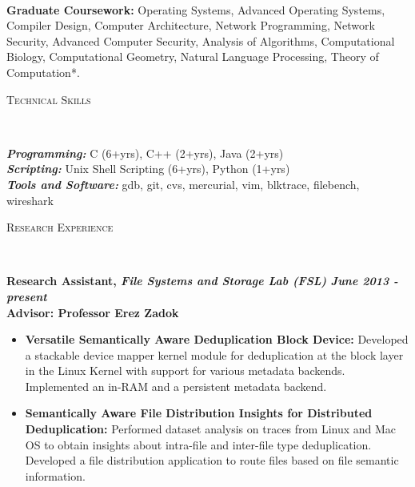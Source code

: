 \documentclass[11pt]{article}
\newenvironment{changemargin}[2]{%
  \begin{list}{}{%
    \setlength{\topsep}{0pt}%
    \setlength{\leftmargin}{#1}%
    \setlength{\rightmargin}{#2}%
    \setlength{\listparindent}{\parindent}%
    \setlength{\itemindent}{\parindent}%
    \setlength{\parsep}{\parskip}%
  }%
  \item[]}{\end{list}
}
\newcommand{\lineover}{
	\begin{changemargin}{-0.05in}{-0.05in}
		\vspace*{-8pt}
		\hrulefill \\
		\vspace*{-2pt}
	\end{changemargin}
}
\newcommand{\header}[1]{
	\begin{changemargin}{-0.5in}{-0.5in}
		\scshape{#1}\\
  	\lineover
	\end{changemargin}
}
\newenvironment{body} {
	\vspace*{-16pt}
	\begin{changemargin}{-0.25in}{-0.5in}
  }	
	{\end{changemargin}
}
\begin{document}
\begin{changemargin}{-0.5in}{-0.5in}
  	\lineover
\end{changemargin}

\begin{body}
	\vspace{14pt}
	\textbf{Graduate Coursework:} Operating Systems, Advanced Operating Systems, Compiler Design, Computer Architecture, Network Programming, Network Security, Advanced Computer Security, Analysis of Algorithms, Computational Biology, Computational Geometry, Natural Language Processing, Theory of Computation*.\\
\end{body}

\smallskip

\header{Technical Skills}

\begin{body}
	\vspace{14pt}
	\emph{\textbf{Programming:}}{} C (6+yrs), C++ (2+yrs), Java (2+yrs)\\
	\emph{\textbf{Scripting:}}{} Unix Shell Scripting (6+yrs), Python (1+yrs)\\
	\emph{\textbf{Tools and Software:}}{} gdb, git, cvs, mercurial, vim, blktrace, filebench, wireshark\\
\end{body}

\smallskip

\header{Research Experience}

\begin{body}
	\vspace{14pt}
	\textbf{Research Assistant, \emph{File Systems and Storage Lab (FSL)} \hfill \emph{June 2013 - present}}\\
	\textbf{Advisor: Professor Erez Zadok}\\
	\vspace*{-4pt}
	\begin{itemize} \itemsep -0pt  %
		\item \textbf{Versatile Semantically Aware Deduplication Block Device:} Developed a stackable device mapper kernel module for deduplication at the block layer in the Linux Kernel with support for various metadata backends. Implemented
an in-RAM and a persistent metadata backend.
		\item \textbf{Semantically Aware File Distribution Insights for Distributed Deduplication:} Performed dataset analysis on traces from Linux and Mac OS to obtain insights about intra-file and inter-file type deduplication. Developed a file distribution application to route files based on file semantic information.
	\end{itemize}
\end{body}
\end{document}
